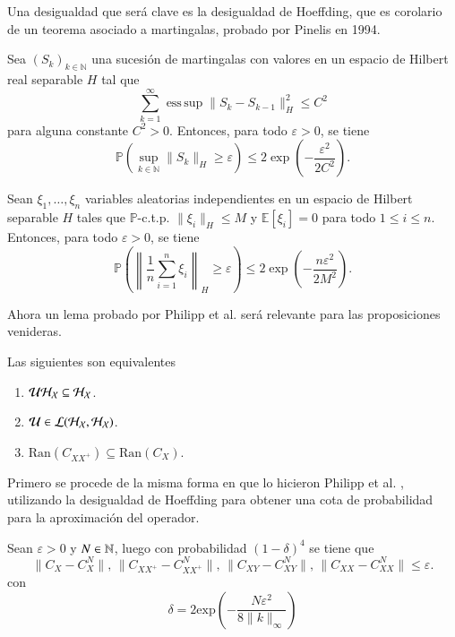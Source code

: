 Una desigualdad que será clave es la desigualdad de Hoeffding, que es corolario de un teorema asociado a martingalas, probado por Pinelis en 1994.

\begin{teo}
Sea $(S_k)_{k \in \mathbb{N}}$ una sucesión de martingalas con valores en un espacio de Hilbert real separable $H$ tal que 
\[
\sum_{k=1}^\infty \operatorname{ess\,sup} \|S_k - S_{k-1}\|_H^2 \leq C^2
\]
para alguna constante $C^2 > 0$. Entonces, para todo $\varepsilon > 0$, se tiene
\[
\mathbb{P} \left( \sup_{k \in \mathbb{N}} \|S_k\|_H \geq \varepsilon \right) \leq 2 \exp \left( -\frac{\varepsilon^2}{2C^2} \right).
\]
\end{teo}

\begin{cor}
Sean $\xi_1, \dots, \xi_n$ variables aleatorias independientes en un espacio de Hilbert separable $H$ tales que $\mathbb{P}$-c.t.p. $\|\xi_i\|_H \leq M$ y $\mathbb{E}[\xi_i] = 0$ para todo $1 \leq i \leq n$. Entonces, para todo $\varepsilon > 0$, se tiene
\[
\mathbb{P} \left( \left\| \frac{1}{n} \sum_{i=1}^n \xi_i \right\|_H \geq \varepsilon \right) \leq 2 \exp \left( -\frac{n\varepsilon^2}{2M^2} \right).
\]
\end{cor}

Ahora un lema probado por Philipp et al. \cite{Philipp2024ErrorOperator} será relevante para las proposiciones venideras.

\begin{lema}
    Las siguientes son equivalentes
    \begin{enumerate}
        \item $\mathcal{U} \mathcal{H}_{\mathcal{X}} \subseteq \mathcal{H}_{\mathcal{X}}$.
        \item $\mathcal{U} \in \mathcal{L}(\mathcal{H}_{\mathcal{X}}, \mathcal{H}_{\mathcal{X}})$.
        \item $\text{Ran}(C_{XX^+}) \subseteq \text{Ran}(C_X).$
    \end{enumerate}
\end{lema}

Primero se procede de la misma forma en que lo hicieron Philipp et al. \cite{Philipp2024ErrorOperator}, utilizando la desigualdad de Hoeffding para obtener una cota de probabilidad para la aproximación del operador.

\begin{prop}
    Sean $\varepsilon > 0$ y $N \in \mathbb{N}$, luego con probabilidad $(1-\delta)^4$ se tiene que
    \[
    \| C_{X} - C_{X}^N \|, \, \| C_{XX^+} - C_{XX^+}^N \|, \, \| C_{XY} - C_{XY}^N \|, \, \| C_{XX} - C_{XX}^N \| \leq \varepsilon.
    \]
    con 
    \[
    \delta = 2 \text{exp} \left ( 
    -\frac{N \varepsilon^2}{8 \| k\|_\infty} \right )
    \]
\end{prop}

